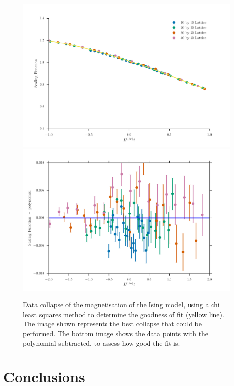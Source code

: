\documentclass[11pt, a4paper]{report} %
\begin{document}
\begin{figure}
	\includegraphics[width=\linewidth]{ising_beta_over_nu_data_collapse.pdf}
	\includegraphics[width=\linewidth]{ising_beta_over_nu_data_collapse_residual.pdf}
	\caption{Data collapse of the magnetisation of the Ising model, using a chi least squares method to determine the goodness of fit (yellow line). The image shown represents the best collapse that could be performed. The bottom image shows the data points with the polynomial subtracted, to assess how good the fit is.}
	\label{fig:ising_chi_data_collapse}
\end{figure}

\chapter{Conclusions}
\end{document}
